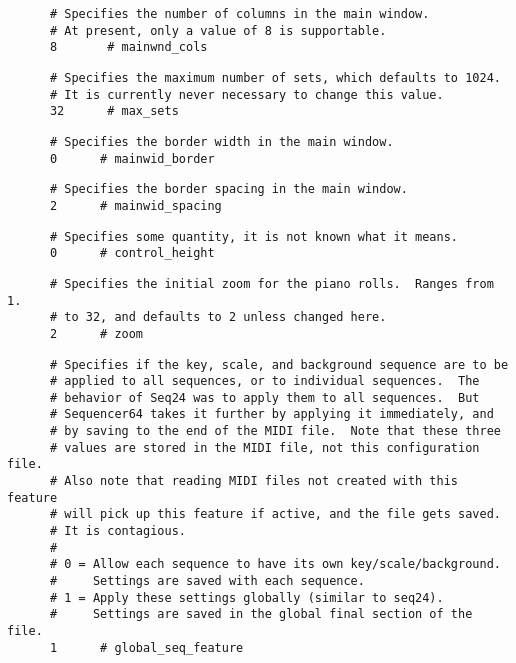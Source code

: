    \begin{verbatim}
      # Specifies the number of columns in the main window.
      # At present, only a value of 8 is supportable.
      8       # mainwnd_cols
   \end{verbatim}

   \begin{verbatim}
      # Specifies the maximum number of sets, which defaults to 1024.
      # It is currently never necessary to change this value.
      32      # max_sets
   \end{verbatim}

   \begin{verbatim}
      # Specifies the border width in the main window.
      0      # mainwid_border
   \end{verbatim}

   \begin{verbatim}
      # Specifies the border spacing in the main window.
      2      # mainwid_spacing
   \end{verbatim}

   \begin{verbatim}
      # Specifies some quantity, it is not known what it means.
      0      # control_height
   \end{verbatim}

   \begin{verbatim}
      # Specifies the initial zoom for the piano rolls.  Ranges from 1.
      # to 32, and defaults to 2 unless changed here.
      2      # zoom
   \end{verbatim}

   \begin{verbatim}
      # Specifies if the key, scale, and background sequence are to be
      # applied to all sequences, or to individual sequences.  The
      # behavior of Seq24 was to apply them to all sequences.  But
      # Sequencer64 takes it further by applying it immediately, and
      # by saving to the end of the MIDI file.  Note that these three
      # values are stored in the MIDI file, not this configuration file.
      # Also note that reading MIDI files not created with this feature
      # will pick up this feature if active, and the file gets saved.
      # It is contagious.
      #
      # 0 = Allow each sequence to have its own key/scale/background.
      #     Settings are saved with each sequence.
      # 1 = Apply these settings globally (similar to seq24).
      #     Settings are saved in the global final section of the file.
      1      # global_seq_feature
   \end{verbatim}

